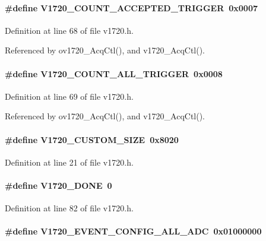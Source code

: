\paragraph[{V1720\_\-COUNT\_\-ACCEPTED\_\-TRIGGER}]{\setlength{\rightskip}{0pt plus 5cm}\#define V1720\_\-COUNT\_\-ACCEPTED\_\-TRIGGER~0x0007}\hfill\label{v1720_8h_ac609c24d42a470d3b98f7a0ba3f41e14}


Definition at line 68 of file v1720.h.

Referenced by ov1720\_\-AcqCtl(), and v1720\_\-AcqCtl().
\paragraph[{V1720\_\-COUNT\_\-ALL\_\-TRIGGER}]{\setlength{\rightskip}{0pt plus 5cm}\#define V1720\_\-COUNT\_\-ALL\_\-TRIGGER~0x0008}\hfill\label{v1720_8h_a126a87bdb3f3c6db57b56e080a6dc8d4}


Definition at line 69 of file v1720.h.

Referenced by ov1720\_\-AcqCtl(), and v1720\_\-AcqCtl().
\paragraph[{V1720\_\-CUSTOM\_\-SIZE}]{\setlength{\rightskip}{0pt plus 5cm}\#define V1720\_\-CUSTOM\_\-SIZE~0x8020}\hfill\label{v1720_8h_a7aa17325fb3521647be068ce3b9c772b}


Definition at line 21 of file v1720.h.
\paragraph[{V1720\_\-DONE}]{\setlength{\rightskip}{0pt plus 5cm}\#define V1720\_\-DONE~0}\hfill\label{v1720_8h_ab63194f51d9822c8ab3e92fc13b70a2a}


Definition at line 82 of file v1720.h.
\paragraph[{V1720\_\-EVENT\_\-CONFIG\_\-ALL\_\-ADC}]{\setlength{\rightskip}{0pt plus 5cm}\#define V1720\_\-EVENT\_\-CONFIG\_\-ALL\_\-ADC~0x01000000}\hfill\label{v1720_8h_a5f69e8dd50b3147657aa8aeeab8219e5}


